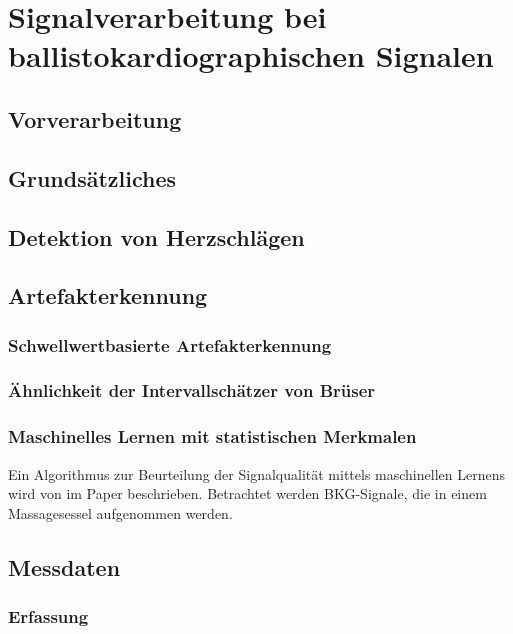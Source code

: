 \chapter{Signalverarbeitung bei ballistokardiographischen Signalen}

\section{Vorverarbeitung}

\section{Grundsätzliches}

\section{Detektion von Herzschlägen}

\section{Artefakterkennung}


	\subsection{Schwellwertbasierte Artefakterkennung}
	
	\subsection{Ähnlichkeit der Intervallschätzer von Brüser}
	
	\subsection{Maschinelles Lernen mit statistischen Merkmalen}
	
	Ein Algorithmus zur Beurteilung der Signalqualität mittels maschinellen Lernens wird von \citeauthor{Sadek2016} im Paper  beschrieben. Betrachtet werden \ac{BKG}-Signale, die in einem Massagesessel aufgenommen werden.

\section{Messdaten}
	
	\subsection{Erfassung}
	
